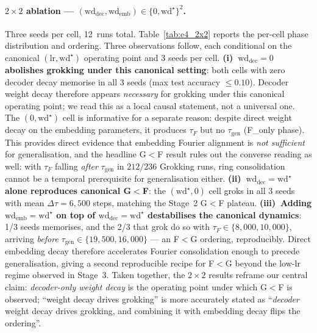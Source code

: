 \documentclass{article}
\newcommand{\taug}{\tau_{\mathrm{gen}}}
\newcommand{\tauf}{\tau_{F}}
\newcommand{\Dtau}{\Delta\tau}
\begin{document}
\paragraph{$2\times 2$ ablation ---
$(\mathrm{wd}_{\mathrm{dec}},\mathrm{wd}_{\mathrm{emb}})\in\{0,\mathrm{wd}^{\star}\}^{2}$.}
Three seeds per cell, 12~runs total.
Table~\ref{tab:e4_2x2} reports the per-cell phase distribution
and ordering.
Three observations follow, each conditional on the canonical
$(\mathrm{lr},\mathrm{wd}^{\star})$ operating point and 3 seeds
per cell.
\textbf{(i)~$\mathrm{wd}_{\mathrm{dec}}{=}0$ abolishes grokking
under this canonical setting}: both cells with zero decoder decay
memorise in all 3 seeds (max test accuracy $\leq 0.10$).
Decoder weight decay therefore appears \emph{necessary} for
grokking under this canonical operating point; we read this as a
local causal statement, not a universal one.
The $(0, \mathrm{wd}^{\star})$ cell is informative for a separate
reason: despite direct weight decay on the embedding parameters,
it produces $\tauf$ but no $\taug$ (F\_only phase).
This provides direct evidence that embedding Fourier alignment is
\emph{not sufficient} for generalisation, and the headline G$<$F
result rules out the converse reading as well: with $\tauf$
falling \emph{after} $\taug$ in $212/236$ Grokking runs, ring
consolidation cannot be a temporal prerequisite for
generalisation either.
\textbf{(ii)~$\mathrm{wd}_{\mathrm{dec}}{=}\mathrm{wd}^{\star}$
alone reproduces canonical G$<$F}: the
$(\mathrm{wd}^{\star},0)$ cell groks in all 3 seeds with mean
$\Dtau{=}6{,}500$ steps, matching the Stage~2 G$<$F plateau.
\textbf{(iii)~Adding $\mathrm{wd}_{\mathrm{emb}}{=}\mathrm{wd}^{\star}$
on top of $\mathrm{wd}_{\mathrm{dec}}{=}\mathrm{wd}^{\star}$
destabilises the canonical dynamics}: 1/3 seeds memorises, and
the 2/3 that grok do so with $\tauf\in\{8{,}000,10{,}000\}$,
arriving \emph{before} $\taug\in\{19{,}500,16{,}000\}$ --- an
F$<$G ordering, reproducibly.
Direct embedding decay therefore accelerates Fourier consolidation
enough to precede generalisation, giving a second reproducible
recipe for F$<$G beyond the low-lr regime
observed in Stage~3.
Taken together, the $2\times 2$ results reframe our central claim:
\emph{decoder-only weight decay} is the operating point under
which G$<$F is observed; ``weight decay drives grokking'' is
more accurately stated as ``\emph{decoder} weight decay drives
grokking, and combining it with embedding decay flips the
ordering''.
\end{document}
